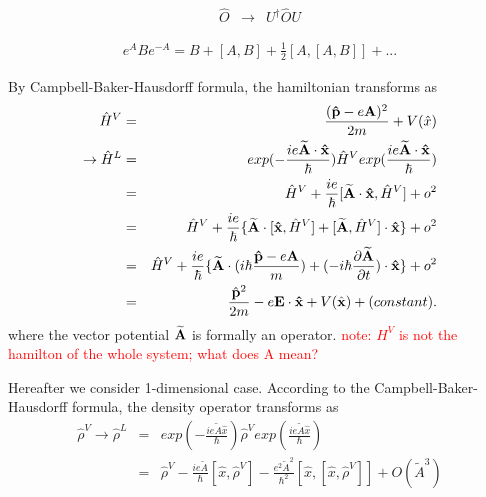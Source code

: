 \documentclass[aps,prb,preprint]{revtex4-1}
\begin{document}
\begin{appendix}
\begin{eqnarray}
\hat{O} &\rightarrow& U^{\dag} \hat{O} U \nonumber 
\end{eqnarray} 

\begin{eqnarray}
e^A B e^{-A} = B+ [A,B] +\frac{1}{2}[A,[A,B]] + ... \nonumber  
\end{eqnarray} 

By Campbell-Baker-Hausdorff formula, the hamiltonian transforms as  
\begin{eqnarray}
\hat{H}^V &=& \frac{ ({\bf \hat{p}} - e{\bf A})^2 }{2m} + V(\hat{x}) \nonumber \nonumber \\ 
\rightarrow \hat{H}^L &=& exp(-\frac{ i e {\bf \widetilde{A} \cdot \hat{x}} }{\hbar}) \hat{H}^V exp( \frac{ i e {\bf \widetilde{A} \cdot \hat{x}}}{\hbar}) \nonumber \\
&=& \hat{H}^V + \frac{i e}{\hbar}[{\bf \widetilde{A} \cdot \hat{x} }, \hat{H}^V] + o^2 \nonumber \\
&=& \hat{H}^V + \frac{i e}{\hbar} \{ {\bf \widetilde{A}} \cdot [ {\bf \hat{x} }, \hat{H}^V] + [ {\bf \widetilde{A}} , \hat{H}^V] \cdot {\bf \hat{x} } \}+ o^2 \nonumber \\
&=& \hat{H}^V + \frac{i e}{\hbar} \{ {\bf \widetilde{A}} \cdot (i \hbar \frac{{\bf \hat{p}} - e{\bf A}}{m}) + (- i \hbar \frac{\partial \widetilde{\bf A}}{\partial t}) \cdot {\bf \hat{x} } \}+ o^2 \nonumber \\
&=& \frac{ \hat{\bf p}^2 }{2m} -e {\bf E \cdot \hat{\bf x}} + V(\hat{\bf x})+ (constant).\nonumber \\
\end{eqnarray} 
where the vector potential ${\bf \widetilde{A}}$ is formally an operator. 
\textcolor{red}{note: $H^V$ is not the hamilton of the whole system; what does A mean?}

Hereafter we consider 1-dimensional case.
According to the Campbell-Baker-Hausdorff formula, the density operator transforms as 
\begin{eqnarray}
\hat{\rho}^V \rightarrow \hat{\rho}^L &=& exp(-\frac{ i e \widetilde{A} \hat{x} }{\hbar}) \hat{\rho}^V exp(\frac{ i e \widetilde{A} \hat{x} }{\hbar})\nonumber \\
&=& \hat{\rho}^V -\frac{ i e \widetilde{A}}{\hbar} [\hat{x}, \hat{\rho}^V ] - \frac{ e^2 \widetilde{A}^2}{\hbar^2} [ \hat{x}, [\hat{x}, \hat{\rho}^V ] ]+ O(\widetilde{A}^3)
\end{eqnarray} 
\fi



\end{appendix}
\end{document}
